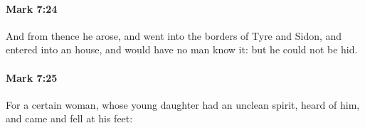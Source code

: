 		\paragraph{Mark 7:24} %
			\label{MARK-7-24}

			And from thence he arose, and went into the borders of Tyre and Sidon, and entered into an house, and would have no man know it: but he could not be hid.

			\begin{framed}
			\scriptsize
				\begin{compactdesc}
					\item[SBLG] 
				\end{compactdesc}
			\end{framed}

		\paragraph{Mark 7:25} %
			\label{MARK-7-25}

			For a certain woman, whose young daughter had an unclean spirit, heard of him, and came and fell at his feet:

